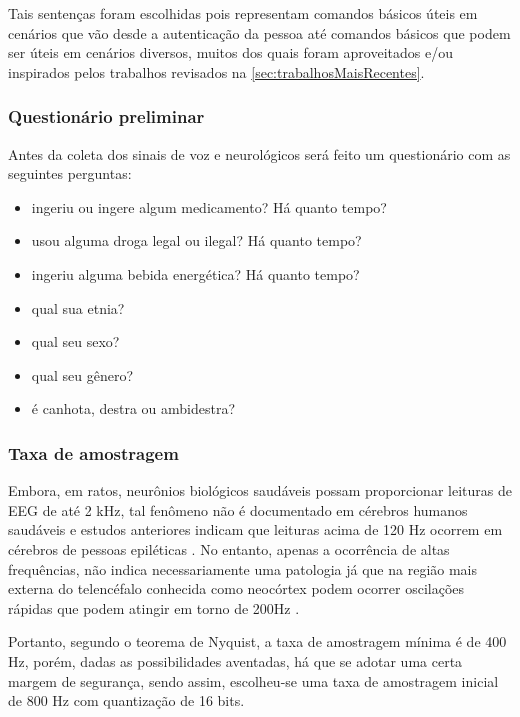 			    \par Tais sentenças foram escolhidas pois representam comandos básicos úteis em cenários que vão desde a autenticação da pessoa até comandos básicos que podem ser úteis em cenários diversos, muitos dos quais foram aproveitados e/ou inspirados pelos trabalhos revisados na \autoref{sec:trabalhosMaisRecentes}.
		    
		    \subsubsection{Questionário preliminar}
		    
			    \par Antes da coleta dos sinais de voz e neurológicos será feito um questionário com as seguintes perguntas:
			    
			    \begin{itemize}
			    	\item ingeriu ou ingere algum medicamento? Há quanto tempo?
			    	\item usou alguma droga legal ou ilegal? Há quanto tempo?
			    	\item ingeriu alguma bebida energética? Há quanto tempo?
			    	\item qual sua etnia?
			    	\item qual seu sexo?
			    	\item qual seu gênero?
			    	\item é canhota, destra ou ambidestra?
			    \end{itemize}
			    
			\subsubsection{Taxa de amostragem}
			
				\par Embora, em ratos, neurônios biológicos saudáveis possam proporcionar leituras de EEG de até 2 kHz, tal fenômeno não é documentado em cérebros humanos saudáveis e estudos anteriores indicam que leituras acima de 120 Hz ocorrem em cérebros de pessoas epiléticas \cite{Moffett2017}. No entanto, apenas a ocorrência de altas frequências, não indica necessariamente uma patologia já que na região mais externa do telencéfalo conhecida como neocórtex podem ocorrer oscilações rápidas que podem atingir em torno de 200Hz \cite{hfreOscEngel}.
				
				\par Portanto, segundo o teorema de Nyquist, a taxa de amostragem mínima é de 400 Hz, porém, dadas as possibilidades aventadas, há que se adotar uma certa margem de segurança, sendo assim, escolheu-se uma taxa de amostragem inicial de 800 Hz com quantização de 16 bits.
				
